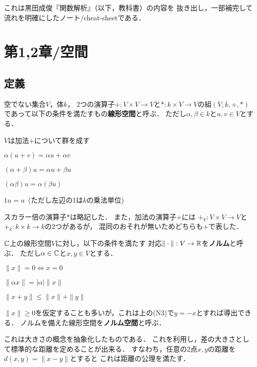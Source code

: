 \documentclass[a4j]{jsarticle}
\begin{document}
    これは黒田成俊『関数解析』（以下，教科書）の内容を
    抜き出し，一部補完して流れを明確にしたノート/cheat-sheetである．

    \section{第1,2章/空間}
    \subsection{定義}
        \begin{Def}
            空でない集合$V$，体$k$，
            2つの演算子$+:V \times V \to V$と$\ast: k \times V \to V$の組$(V,k,+,\ast)$
            であって以下の条件を満たすもの\textbf{線形空間}と呼ぶ．
            ただし$\alpha, \beta \in k$と$u,v \in V$とする．
            \begin{description}
                \setlength{\leftskip}{0.5truecm}
                \item[V1] $V$は加法$+$について群を成す
                \item[V2] $\alpha(u+v)=\alpha u+\alpha v$
                \item[V3] $(\alpha+\beta)u=\alpha u+\beta u$
                \item[V4] $(\alpha \beta)u=\alpha (\beta u)$
                \item[V5] $1 u=u$~(ただし左辺の1は$k$の乗法単位)
            \end{description}
            スカラー倍の演算子$\ast$は略記した．
            また，加法の演算子+には
            $+_{V}:V \times V \to V$と$+_{k}: k \times k \to k$の2つがあるが，
            混同のおそれが無いためどちらも+で表した．
        \end{Def}

        \begin{Def}
            $\mathbb{C}$上の線形空間$V$に対し，以下の条件を満たす
            対応$\| \cdot \|: V \to \mathbb{R} $を\textbf{ノルム}と呼ぶ．
            ただし$\alpha \in \mathbb{C}$と$x, y \in V$とする．
            \begin{description}
                \setlength{\leftskip}{0.5truecm}
                \item[N1] $\|x\|=0 \iff x=0$
                \item[N2] $\|\alpha x\| =|\alpha| \|x\|$
                \item[N3] $\|x+y\| \leq \|x\|+\|y\|$
            \end{description}
            $\|x\| \geq 0$を仮定することも多いが，これは上の(N3)で$y=-x$とすれば導出できる．
            ノルムを備えた線形空間を\textbf{ノルム空間}と呼ぶ．
        \end{Def}
        これは大きさの概念を抽象化したものである．
        これを利用し，差の大きさとして標準的な距離を定めることが出来る．
        すなわち，任意の2点$x,y$の距離を$d(x,y)=\|x-y\|$とすると
        これは距離の公理を満たす．
\end{document}
